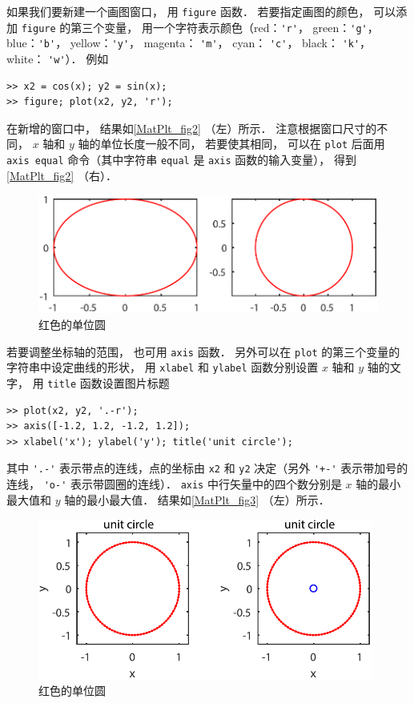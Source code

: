 如果我们要新建一个画图窗口， 用 \lstinline|figure| 函数． 若要指定画图的颜色， 可以添加 \lstinline|figure| 的第三个变量， 用一个字符表示颜色（red：\lstinline|'r'|， green：\lstinline|'g'|， blue：\lstinline|'b'|， yellow：\lstinline|'y'|， magenta： \lstinline|'m'|， cyan： \lstinline|'c'|， black： \lstinline|'k'|， white： \lstinline|'w'|）． 例如
\begin{lstlisting}[language=matlabC]
>> x2 = cos(x); y2 = sin(x);
>> figure; plot(x2, y2, 'r');
\end{lstlisting}
在新增的窗口中， 结果如\autoref{MatPlt_fig2} （左）所示． 注意根据窗口尺寸的不同， $x$ 轴和 $y$ 轴的单位长度一般不同， 若要使其相同， 可以在 \lstinline|plot| 后面用 \lstinline|axis equal| 命令（其中字符串 \lstinline|equal| 是 \lstinline|axis| 函数的输入变量）， 得到\autoref{MatPlt_fig2} （右）．
\begin{figure}[ht]
\centering
\includegraphics[width=13cm]{./figures/MatPlt_2.pdf}
\caption{红色的单位圆} \label{MatPlt_fig2}
\end{figure}
若要调整坐标轴的范围， 也可用 \lstinline|axis| 函数． 另外可以在 \lstinline|plot| 的第三个变量的字符串中设定曲线的形状， 用 \lstinline|xlabel| 和 \lstinline|ylabel| 函数分别设置 $x$ 轴和 $y$ 轴的文字， 用 \lstinline|title| 函数设置图片标题
\begin{lstlisting}[language=matlabC]
>> plot(x2, y2, '.-r');
>> axis([-1.2, 1.2, -1.2, 1.2]);
>> xlabel('x'); ylabel('y'); title('unit circle');
\end{lstlisting}
其中 \lstinline|'.-'| 表示带点的连线，点的坐标由 \lstinline|x2| 和 \lstinline|y2| 决定（另外 \lstinline|'+-'| 表示带加号的连线， \lstinline|'o-'| 表示带圆圈的连线）． \lstinline|axis| 中行矢量中的四个数分别是 $x$ 轴的最小最大值和 $y$ 轴的最小最大值． 结果如\autoref{MatPlt_fig3} （左）所示．
\begin{figure}[ht]
\centering
\includegraphics[width=11cm]{./figures/MatPlt_3.pdf}
\caption{红色的单位圆} \label{MatPlt_fig3}
\end{figure}

